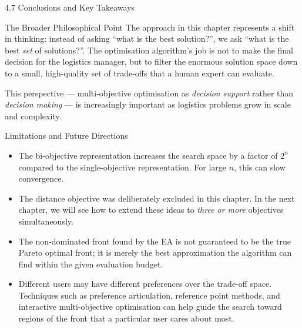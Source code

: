 \documentclass[aspectratio=169,10pt]{beamer}
\begin{document}
\begin{frame}[allowframebreaks]{4.7 Conclusions and Key Takeaways}
  \begin{alertblock}{The Broader Philosophical Point}
    The approach in this chapter represents a shift in thinking: instead of
    asking ``what is the best solution?'', we ask ``what is the best
    \emph{set} of solutions?''.  The optimisation algorithm's job is not to
    make the final decision for the logistics manager, but to filter the
    enormous solution space down to a small, high-quality set of trade-offs
    that a human expert can evaluate.
  \end{alertblock}

  This perspective --- multi-objective optimisation as \emph{decision support}
  rather than \emph{decision making} --- is increasingly important as logistics
  problems grow in scale and complexity.

  \framebreak

  \begin{block}{Limitations and Future Directions}
    \begin{itemize}
      \item The bi-objective representation increases the search space by a
        factor of $2^n$ compared to the single-objective representation.
        For large $n$, this can slow convergence.
      \item The distance objective was deliberately excluded in this chapter.
        In the next chapter, we will see how to extend these ideas to
        \emph{three or more} objectives simultaneously.
      \item The non-dominated front found by the EA is not guaranteed to be
        the true Pareto optimal front; it is merely the best approximation
        the algorithm can find within the given evaluation budget.
      \item Different users may have different preferences over the trade-off
        space.  Techniques such as preference articulation, reference point
        methods, and interactive multi-objective optimisation can help guide
        the search toward regions of the front that a particular user cares
        about most.
    \end{itemize}
  \end{block}

  \framebreak


\end{frame}
\end{document}
